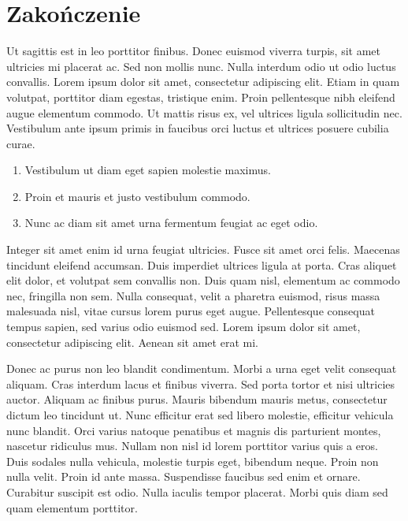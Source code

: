 \documentclass[polish,engineering]{wizthesis}
\begin{document}
{\backmatter %
\chapter{Zakończenie}

Ut sagittis est in leo porttitor finibus. Donec euismod viverra turpis, sit amet
ultricies mi placerat ac. Sed non mollis nunc. Nulla interdum odio ut odio
luctus convallis. Lorem ipsum dolor sit amet, consectetur adipiscing elit. Etiam
in quam volutpat, porttitor diam egestas, tristique enim. Proin pellentesque
nibh eleifend augue elementum commodo. Ut mattis risus ex, vel ultrices ligula
sollicitudin nec. Vestibulum ante ipsum primis in faucibus orci luctus et
ultrices posuere cubilia curae.
\begin{enumerate}[noitemsep]
  \item Vestibulum ut diam eget sapien molestie maximus.
  \item Proin et mauris et justo vestibulum commodo.
  \item Nunc ac diam sit amet urna fermentum feugiat ac eget odio.
\end{enumerate}
Integer sit amet enim id urna feugiat ultricies. Fusce sit amet orci felis.
Maecenas tincidunt eleifend accumsan. Duis imperdiet ultrices ligula at porta.
Cras aliquet elit dolor, et volutpat sem convallis non. Duis quam nisl,
elementum ac commodo nec, fringilla non sem. Nulla consequat, velit a pharetra
euismod, risus massa malesuada nisl, vitae cursus lorem purus eget augue.
Pellentesque consequat tempus sapien, sed varius odio euismod sed. Lorem ipsum
dolor sit amet, consectetur adipiscing elit. Aenean sit amet erat mi.

Donec ac purus non leo blandit condimentum. Morbi a urna eget velit consequat
aliquam. Cras interdum lacus et finibus viverra. Sed porta tortor et nisi
ultricies auctor. Aliquam ac finibus purus. Mauris bibendum mauris metus,
consectetur dictum leo tincidunt ut. Nunc efficitur erat sed libero molestie,
efficitur vehicula nunc blandit. Orci varius natoque penatibus et magnis dis
parturient montes, nascetur ridiculus mus. Nullam non nisl id lorem porttitor
varius quis a eros. Duis sodales nulla vehicula, molestie turpis eget, bibendum
neque. Proin non nulla velit. Proin id ante massa. Suspendisse faucibus sed enim
et ornare. Curabitur suscipit est odio. Nulla iaculis tempor placerat. Morbi
quis diam sed quam elementum porttitor.
}



\end{document}
